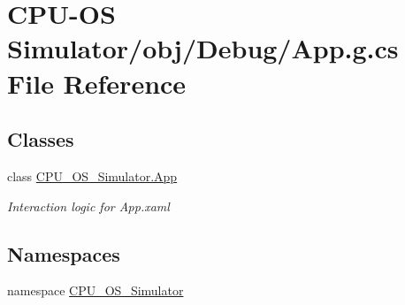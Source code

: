 \hypertarget{_c_p_u-_o_s_01_simulator_2obj_2_debug_2_app_8g_8cs}{}\section{C\+P\+U-\/\+O\+S Simulator/obj/\+Debug/\+App.g.\+cs File Reference}
\label{_c_p_u-_o_s_01_simulator_2obj_2_debug_2_app_8g_8cs}
\subsection*{Classes}
\begin{DoxyCompactItemize}
\item 
class \hyperlink{class_c_p_u___o_s___simulator_1_1_app}{C\+P\+U\+\_\+\+O\+S\+\_\+\+Simulator.\+App}
\begin{DoxyCompactList}\small\item\em Interaction logic for App.\+xaml \end{DoxyCompactList}\end{DoxyCompactItemize}
\subsection*{Namespaces}
\begin{DoxyCompactItemize}
\item 
namespace \hyperlink{namespace_c_p_u___o_s___simulator}{C\+P\+U\+\_\+\+O\+S\+\_\+\+Simulator}
\end{DoxyCompactItemize}
